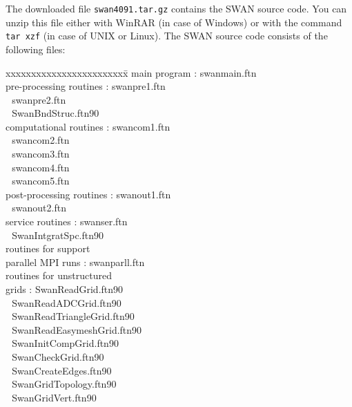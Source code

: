 \documentclass[12pt]{book}
\begin{document}
The downloaded file {\tt swan4091.tar.gz} contains the SWAN source code. You can unzip this
file either with WinRAR (in case of Windows) or with the command {\tt tar xzf} (in case of
UNIX or Linux). The SWAN source code consists of the following files:
\begin{tabbing}
xxxxxxxxxxxxxxxxxxxxxxxx\= \kill
main program             \>:       swanmain.ftn \\
pre-processing routines  \>:       swanpre1.ftn \\
                         \> $\,\,$ swanpre2.ftn \\
                         \> $\,\,$ SwanBndStruc.ftn90 \\
computational routines   \>:       swancom1.ftn \\
                         \> $\,\,$ swancom2.ftn \\
                         \> $\,\,$ swancom3.ftn \\
                         \> $\,\,$ swancom4.ftn \\
                         \> $\,\,$ swancom5.ftn \\
post-processing routines \>:       swanout1.ftn \\
                         \> $\,\,$ swanout2.ftn \\
service routines         \>:       swanser.ftn \\
                         \> $\,\,$ SwanIntgratSpc.ftn90 \\
routines for support     \> \\
parallel MPI runs        \>:       swanparll.ftn \\
routines for unstructured \> $\,\,$ \\
grids                     \>:       SwanReadGrid.ftn90 \\
                          \> $\,\,$ SwanReadADCGrid.ftn90 \\
                          \> $\,\,$ SwanReadTriangleGrid.ftn90 \\
                          \> $\,\,$ SwanReadEasymeshGrid.ftn90 \\
                          \> $\,\,$ SwanInitCompGrid.ftn90 \\
                          \> $\,\,$ SwanCheckGrid.ftn90 \\
                          \> $\,\,$ SwanCreateEdges.ftn90 \\
                          \> $\,\,$ SwanGridTopology.ftn90 \\
                          \> $\,\,$ SwanGridVert.ftn90 \\

\end{tabbing}
\end{document}
